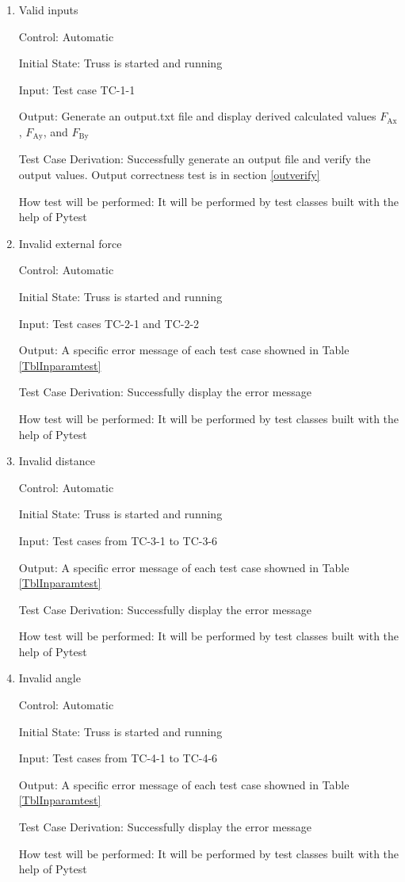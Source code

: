 \documentclass[12pt, titlepage]{article}
\begin{document}
\begin{enumerate}
\item{Valid inputs\\}

Control: Automatic

Initial State: Truss is started and running

Input: Test case TC-1-1

Output: Generate an output.txt file and display derived calculated values 
$F_\text{Ax}$, $F_\text{Ay}$, and $F_\text{By}$

Test Case Derivation: Successfully generate an output file and verify the 
output values. Output correctness test is in section \ref{outverify}

How test will be performed: It will be performed by test classes built with 
the help of Pytest

\item{Invalid external force\\}

Control: Automatic

Initial State: Truss is started and running

Input: Test cases TC-2-1 and TC-2-2

Output: A specific error message of each test case showned in 
Table \ref{TblInparamtest}

Test Case Derivation: Successfully display the error message

How test will be performed: It will be performed by test classes built with 
the help of Pytest

\item{Invalid distance\\}

Control: Automatic
					
Initial State: Truss is started and running
					
Input: Test cases from TC-3-1 to TC-3-6
					
Output: A specific error message of each test case showned in 
Table \ref{TblInparamtest}

Test Case Derivation: Successfully display the error message

How test will be performed: It will be performed by test classes built with 
the help of Pytest

\item{Invalid angle\\}

Control: Automatic

Initial State: Truss is started and running

Input: Test cases from TC-4-1 to TC-4-6

Output: A specific error message of each test case showned in 
Table \ref{TblInparamtest}

Test Case Derivation: Successfully display the error message

How test will be performed: It will be performed by test classes built with 
the help of Pytest

\end{enumerate}
\end{document}

